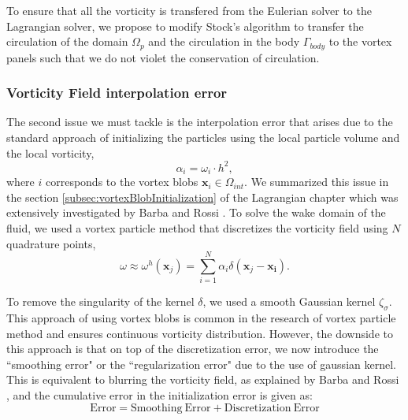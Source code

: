 To ensure that all the vorticity is transfered from the Eulerian solver to the Lagrangian solver, we propose to modify Stock's algorithm to transfer the circulation of the domain $\Omega_p$ and the circulation in the body $\Gamma_{body}$ to the vortex panels such that we do not violet the conservation of circulation.

\subsubsection{Vorticity Field interpolation error}
\label{subsubsec:vfie}	
The second issue we must tackle is the interpolation error that arises due to the standard approach of initializing the particles using the local particle volume and the local vorticity,
	\begin{equation}
	\alpha_i = \omega_i\cdot{h^2},
	\end{equation}
where $i$ corresponds to the vortex blobs $\mathbf{x}_i \in \Omega_{int}$. We summarized this issue in the section \ref{subsec:vortexBlobInitialization} of the Lagrangian chapter which was extensively investigated by Barba and Rossi \cite{Barba2010a}. To solve the wake domain of the fluid, we used a vortex particle method that discretizes the vorticity field using $N$ quadrature points,
\begin{equation}
\omega \approx \omega^h(\mathbf{x}_j) = \sum_{i=1}^N \alpha_i \delta(\mathbf{x}_j - \mathbf{x_i}).
\end{equation}

To remove the singularity of the kernel $\delta$, we used a smooth Gaussian kernel $\zeta_{\sigma}$. This approach of using vortex blobs is common in the research of vortex particle method and ensures continuous vorticity distribution. However, the downside to this approach is that on top of the discretization error, we now introduce the ``smoothing error" or the ``regularization error" due to the use of gaussian kernel. This is equivalent to blurring the vorticity field, as explained by Barba and Rossi \cite{Barba2010a}, and the cumulative error in the initialization error is given as:
\begin{equation*}
\mathrm{Error} = \mathrm{Smoothing\  Error} + \mathrm{Discretization\ Error}
\end{equation*}

